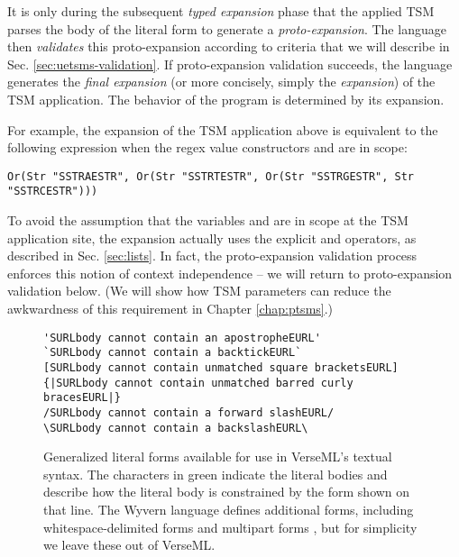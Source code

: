 It is only during the subsequent \emph{typed expansion} phase that the applied TSM parses the {body} of the literal form to generate a \emph{proto-expansion}. The language then \emph{validates} this proto-expansion according to criteria that we will describe in Sec. \ref{sec:uetsms-validation}. If proto-expansion validation succeeds, the language generates the \emph{final expansion} (or more concisely, simply the \emph{expansion}) of the TSM application. The behavior of the program is determined by its expansion. 

For example, the expansion of the TSM application above is equivalent to the following expression when the regex value constructors  and  are in scope:
\begin{lstlisting}[numbers=none]
Or(Str "SSTRAESTR", Or(Str "SSTRTESTR", Or(Str "SSTRGESTR", Str "SSTRCESTR")))
\end{lstlisting}
To avoid the assumption that the variables  and  are in scope at the TSM application site, the expansion actually uses the explicit  and  operators, as described in Sec. \ref{sec:lists}. In fact, the proto-expansion validation process enforces this notion of context independence -- we will return to proto-expansion validation below. (We will show how TSM parameters can reduce the awkwardness of this requirement in Chapter \ref{chap:ptsms}.)



\begin{figure}
\begin{lstlisting}
'SURLbody cannot contain an apostropheEURL'
`SURLbody cannot contain a backtickEURL`
[SURLbody cannot contain unmatched square bracketsEURL]
{|SURLbody cannot contain unmatched barred curly bracesEURL|}
/SURLbody cannot contain a forward slashEURL/
\SURLbody cannot contain a backslashEURL\
\end{lstlisting}
\caption[Generalized literal forms available in VerseML]{Generalized literal forms available for use in VerseML's textual syntax. The characters in green indicate the literal bodies and describe how the literal body is constrained by the form shown on that line. The Wyvern language defines additional forms, including whitespace-delimited forms \cite{TSLs} and multipart forms \cite{sac15}, but for simplicity we leave these out of VerseML.}
\label{fig:literal-forms}
\end{figure}
